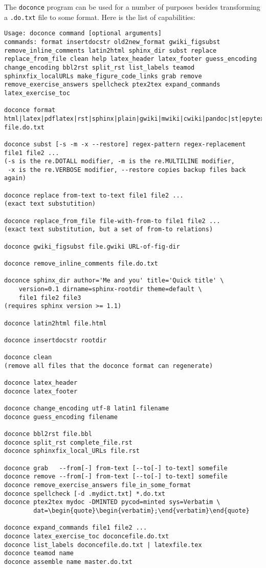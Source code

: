 \documentclass[twoside]{article}
\begin{document}
The {\fontsize{10pt}{10pt}\verb!doconce!} program can be used for a number of purposes besides
transforming a {\fontsize{10pt}{10pt}\verb!.do.txt!} file to some format. Here is the
list of capabilities:

\begin{Verbatim}
Usage: doconce command [optional arguments]
commands: format insertdocstr old2new_format gwiki_figsubst remove_inline_comments latin2html sphinx_dir subst replace replace_from_file clean help latex_header latex_footer guess_encoding change_encoding bbl2rst split_rst list_labels teamod sphinxfix_localURLs make_figure_code_links grab remove remove_exercise_answers spellcheck ptex2tex expand_commands latex_exercise_toc

doconce format html|latex|pdflatex|rst|sphinx|plain|gwiki|mwiki|cwiki|pandoc|st|epytext file.do.txt

doconce subst [-s -m -x --restore] regex-pattern regex-replacement file1 file2 ...
(-s is the re.DOTALL modifier, -m is the re.MULTILINE modifier,
 -x is the re.VERBOSE modifier, --restore copies backup files back again)

doconce replace from-text to-text file1 file2 ...
(exact text substutition)

doconce replace_from_file file-with-from-to file1 file2 ...
(exact text substitution, but a set of from-to relations)

doconce gwiki_figsubst file.gwiki URL-of-fig-dir

doconce remove_inline_comments file.do.txt

doconce sphinx_dir author='Me and you' title='Quick title' \
    version=0.1 dirname=sphinx-rootdir theme=default \
    file1 file2 file3
(requires sphinx version >= 1.1)

doconce latin2html file.html

doconce insertdocstr rootdir

doconce clean
(remove all files that the doconce format can regenerate)

doconce latex_header
doconce latex_footer

doconce change_encoding utf-8 latin1 filename
doconce guess_encoding filename

doconce bbl2rst file.bbl
doconce split_rst complete_file.rst
doconce sphinxfix_local_URLs file.rst

doconce grab   --from[-] from-text [--to[-] to-text] somefile
doconce remove --from[-] from-text [--to[-] to-text] somefile
doconce remove_exercise_answers file_in_some_format
doconce spellcheck [-d .mydict.txt] *.do.txt
doconce ptex2tex mydoc -DMINTED pycod=minted sys=Verbatim \
        dat=\begin{quote}\begin{verbatim};\end{verbatim}\end{quote}

doconce expand_commands file1 file2 ...
doconce latex_exercise_toc doconcefile.do.txt
doconce list_labels doconcefile.do.txt | latexfile.tex
doconce teamod name
doconce assemble name master.do.txt
\end{Verbatim}
\end{document}
